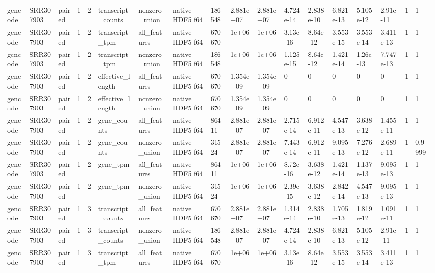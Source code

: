 \begin{tabular}{llllllllllllllllll}
gencode & SRR307903 & paired & 1 & 2 & transcript\_counts & nonzero\_union & native HDF5 f64 & 186548 & 2.881e+07 & 2.881e+07 & 4.724e-14 & 2.838e-10 & 6.821e-13 & 5.105e-12 & 2.91e-11 & 1 & 1 \\
gencode & SRR307903 & paired & 1 & 2 & transcript\_tpm & all\_features & native HDF5 f64 & 670670 & 1e+06 & 1e+06 & 3.13e-16 & 8.64e-12 & 3.553e-15 & 3.553e-14 & 3.411e-13 & 1 & 1 \\
gencode & SRR307903 & paired & 1 & 2 & transcript\_tpm & nonzero\_union & native HDF5 f64 & 186548 & 1e+06 & 1e+06 & 1.125e-15 & 8.64e-12 & 1.421e-14 & 1.26e-13 & 7.747e-13 & 1 & 1 \\
gencode & SRR307903 & paired & 1 & 2 & effective\_length & all\_features & native HDF5 f64 & 670670 & 1.354e+09 & 1.354e+09 & 0 & 0 & 0 & 0 & 0 & 1 & 1 \\
gencode & SRR307903 & paired & 1 & 2 & effective\_length & nonzero\_union & native HDF5 f64 & 670670 & 1.354e+09 & 1.354e+09 & 0 & 0 & 0 & 0 & 0 & 1 & 1 \\
gencode & SRR307903 & paired & 1 & 2 & gene\_counts & all\_features & native HDF5 f64 & 86411 & 2.881e+07 & 2.881e+07 & 2.715e-14 & 6.912e-11 & 4.547e-13 & 3.638e-12 & 1.455e-11 & 1 & 1 \\
gencode & SRR307903 & paired & 1 & 2 & gene\_counts & nonzero\_union & native HDF5 f64 & 31524 & 2.881e+07 & 2.881e+07 & 7.443e-14 & 6.912e-11 & 9.095e-13 & 7.276e-12 & 2.689e-11 & 1 & 0.9999 \\
gencode & SRR307903 & paired & 1 & 2 & gene\_tpm & all\_features & native HDF5 f64 & 86411 & 1e+06 & 1e+06 & 8.72e-16 & 3.638e-12 & 1.421e-14 & 1.137e-13 & 9.095e-13 & 1 & 1 \\
gencode & SRR307903 & paired & 1 & 2 & gene\_tpm & nonzero\_union & native HDF5 f64 & 31524 & 1e+06 & 1e+06 & 2.39e-15 & 3.638e-12 & 2.842e-14 & 4.547e-13 & 9.095e-13 & 1 & 1 \\
gencode & SRR307903 & paired & 1 & 3 & transcript\_counts & all\_features & native HDF5 f64 & 670670 & 2.881e+07 & 2.881e+07 & 1.314e-14 & 2.838e-10 & 1.705e-13 & 1.819e-12 & 1.091e-11 & 1 & 1 \\
gencode & SRR307903 & paired & 1 & 3 & transcript\_counts & nonzero\_union & native HDF5 f64 & 186548 & 2.881e+07 & 2.881e+07 & 4.724e-14 & 2.838e-10 & 6.821e-13 & 5.105e-12 & 2.91e-11 & 1 & 1 \\
gencode & SRR307903 & paired & 1 & 3 & transcript\_tpm & all\_features & native HDF5 f64 & 670670 & 1e+06 & 1e+06 & 3.13e-16 & 8.64e-12 & 3.553e-15 & 3.553e-14 & 3.411e-13 & 1 & 1 \\

\end{tabular}
